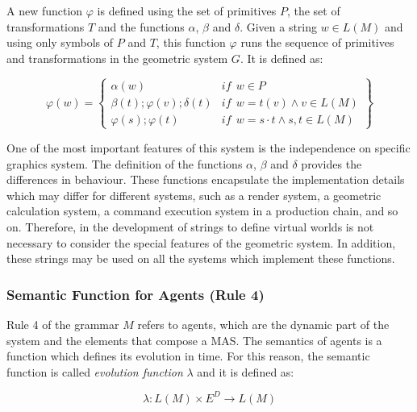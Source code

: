 \documentclass[runningheads]{llncs}
\begin{document}
A new function $\varphi$ is defined using the set of primitives $P$, the set
of transformations $T$ and the functions $\alpha$, $\beta$ and $\delta$. Given a
string $w \in L(M)$ and using only symbols of $P$ and $T$, this function
$\varphi$ runs the sequence of primitives and transformations in the geometric
system $G$. It is defined as:

\begin{equation}
    \varphi (w) = \left\{
    \begin{array}{ll}
        \alpha(w) & \mathit{if} \ \ w \in P  \\

        \beta(t); \varphi(v); \delta(t) & \mathit{if} \ \ w = t(v)
\wedge v \in L(M) \\

        \varphi(s); \varphi(t)  & \mathit{if} \ \ w = s \cdotp t \wedge
s, t \in L(M)
    \end{array}\right\}
\end{equation}


One of the most important features of this system is the independence on specific graphics
system. The definition of the functions $\alpha$, $\beta$ and $\delta$ provides the differences in
behaviour. These functions encapsulate the implementation details which may differ for different
systems, such as a render system, a geometric calculation system, a command execution system in a
production chain, and so on. Therefore, in the development of strings to define virtual worlds is
not necessary to consider the special features of the geometric system. In addition, these strings 
may be used on all the systems which implement these functions.

	

\subsubsection{Semantic Function for Agents (Rule 4)
\label{sec:rule4}}

Rule 4 of the grammar $M$ refers to agents, which are the dynamic part of the system and the elements that compose a MAS. The semantics of agents is a function which defines its evolution in time. For this reason, the semantic function is called \textit{evolution function} $\lambda$ and it is defined as:

\begin{equation}
    \lambda: L(M) \times E^D \rightarrow L(M)
\end{equation}
\end{document}
